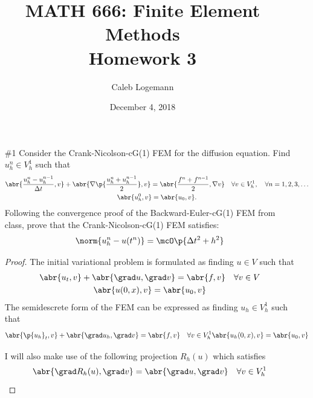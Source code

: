 \documentclass[11pt, titlepage]{article}
\author{Caleb Logemann}
\title{MATH 666: Finite Element Methods \\ Homework 3}
\date{December 4, 2018}
\begin{document}
\maketitle

%
\begin{enumerate}
  \item[\#1] %
    Consider the Crank-Nicolson-cG(1) FEM for the diffusion equation.
    Find $u^n_h \in V^1_h$ such that
    \begin{gather*}
      \abr{\frac{u^n_h - u^{n-1}_h}{\Delta t}, v} +
      \abr{\nabla \p{\frac{u^n_h + u^{n-1}_h}{2}}, v} = 
      \abr{\frac{f^n + f^{n-1}}{2}, \nabla v}
      \quad \forall v \in V^1_h, \quad \forall n = 1, 2, 3, \ldots \\
      \abr{u^0_h, v} = \abr{u_0, v}.
    \end{gather*}
    Following the convergence proof of the Backward-Euler-cG(1) FEM from class,
    prove that the Crank-Nicolson-cG(1) FEM satisfies:
    \[
      \norm{u^n_h - u(t^n)} = \mcO\p{\Delta t^2 + h^2}
    \]

    \begin{proof}
      The initial variational problem is formulated as finding $u \in V$ such that
      \begin{gather*}
        \abr{u_t, v} + \abr{\grad u, \grad v} = \abr{f, v} \quad \forall v \in V \\
        \abr{u(0, x), v} = \abr{u_0, v}
      \end{gather*}
      The semidescrete form of the FEM can be expressed as finding $u_h \in V^1_h$
      such that
      \[
        \abr{\p{u_h}_t, v} + \abr{\grad u_h, \grad v} = \abr{f, v} \quad \forall v \in V^1_h
        \abr{u_h(0, x), v} = \abr{u_0, v}
      \]

      I will also make use of the following projection $R_h(u)$ which satisfies
      \[
        \abr{\grad R_h(u), \grad v} = \abr{\grad u, \grad v} \quad \forall v \in V^1_h
      \]


\end{proof}
\end{enumerate}
\end{document}
